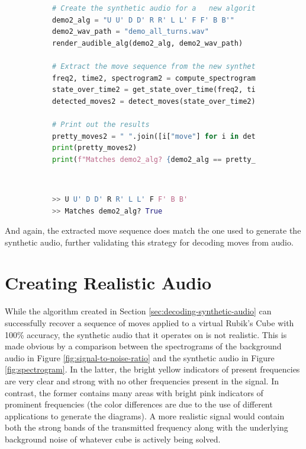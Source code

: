 \begin{figure}[h]
\caption{Full Example: Audio generation and move extraction}
\label{fig:code-synthetic-extraction-demo} 
\begin{subfigure}{\textwidth}
\begin{lstlisting}[language=Python]
# Create the synthetic audio for a   new algorithm
demo2_alg = "U U' D D' R R' L L' F F' B B'"
demo2_wav_path = "demo_all_turns.wav"
render_audible_alg(demo2_alg, demo2_wav_path)

# Extract the move sequence from the new synthetic audio
freq2, time2, spectrogram2 = compute_spectrogram(demo2_wav_path)
state_over_time2 = get_state_over_time(freq2, time2, spectrogram2)
detected_moves2 = detect_moves(state_over_time2)

# Print out the results
pretty_moves2 = " ".join([i["move"] for i in detected_moves2])
print(pretty_moves2)
print(f"Matches demo2_alg? {demo2_alg == pretty_moves2}")
\end{lstlisting}
\end{subfigure}\\

\begin{subfigure}{\textwidth}
\begin{lstlisting}[language=Python, numbers=none]
>> U U' D D' R R' L L' F F' B B'
>> Matches demo2_alg? True
\end{lstlisting}
\end{subfigure}
\end{figure}

And again, the extracted move sequence does match the one used to
generate the synthetic audio, further validating this strategy for
decoding moves from audio.

\newpage
\section{Creating Realistic Audio}
\label{sec:adding-realistic-noise}

While the algorithm created in Section
\ref{sec:decoding-synthetic-audio} can successfully recover a sequence
of moves applied to a virtual Rubik's Cube with 100\% accuracy, the
synthetic audio that it operates on is not realistic. This is made
obvious by a comparison between the spectrograms of the background
audio in Figure \ref{fig:signal-to-noise-ratio} and the synthetic audio
in Figure \ref{fig:spectrogram}. In the latter, the bright yellow
indicators of present frequencies are very clear and strong with no
other frequencies present in the signal. In contrast, the former
contains many areas with bright pink indicators of prominent
frequencies (the color differences are due to the use of different
applications to generate the diagrams). A more realistic signal would
contain both the strong bands of the transmitted frequency along with
the underlying background noise of whatever cube is actively being
solved.

